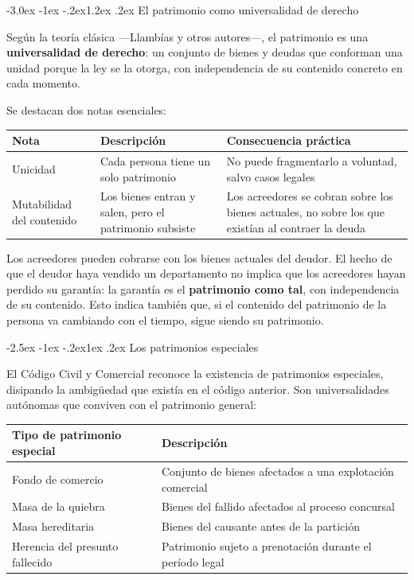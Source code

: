 \documentclass[12pt,oneside]{book}
\makeatletter
\renewcommand\section{\@startsection{section}{1}{\z@}%
  {-3.0ex \@plus -1ex \@minus -.2ex}{1.2ex \@plus .2ex}%
  {\normalfont\large\bfseries\color{acento}}}
\renewcommand\subsection{\@startsection{subsection}{2}{\z@}%
  {-2.5ex \@plus -1ex \@minus -.2ex}{1ex \@plus .2ex}%
  {\normalfont\normalsize\bfseries}}
\newenvironment{tabla}{%
    \par\medskip\begingroup\small\renewcommand{\arraystretch}{1.3}\noindent\ignorespaces
}{%
    \par\endgroup\medskip
}
\makeatother
\begin{document}
\section{El patrimonio como universalidad de derecho}

\begin{definicion}
Según la teoría clásica ---Llambías y otros autores---, el patrimonio es una \textbf{universalidad de derecho}: un conjunto de bienes y deudas que conforman una unidad porque la ley se la otorga, con independencia de su contenido concreto en cada momento.
\end{definicion}

Se destacan dos notas esenciales:

\begin{tabla}
\begin{tabularx}{\textwidth}{B{3.0cm}YY}
\toprule
Nota & \textbf{Descripción} & \textbf{Consecuencia práctica} \\
\midrule
Unicidad & Cada persona tiene un solo patrimonio & No puede fragmentarlo a voluntad, salvo casos legales \\
Mutabilidad del contenido & Los bienes entran y salen, pero el patrimonio subsiste & Los acreedores se cobran sobre los bienes actuales, no sobre los que existían al contraer la deuda \\
\bottomrule
\end{tabularx}
\end{tabla}

Los acreedores pueden cobrarse con los bienes actuales del deudor. El hecho de que el deudor haya vendido un departamento no implica que los acreedores hayan perdido su garantía: la garantía es el \textbf{patrimonio como tal}, con independencia de su contenido. Esto indica también que, si el contenido del patrimonio de la persona va cambiando con el tiempo, sigue siendo su patrimonio.

\subsection{Los patrimonios especiales}

El Código Civil y Comercial reconoce la existencia de patrimonios especiales, disipando la ambigüedad que existía en el código anterior. Son universalidades autónomas que conviven con el patrimonio general:

\begin{tabla}
\begin{tabularx}{\textwidth}{B{4.6cm}Y}
\toprule
Tipo de patrimonio especial & \textbf{Descripción} \\
\midrule
Fondo de comercio & Conjunto de bienes afectados a una explotación comercial \\
Masa de la quiebra & Bienes del fallido afectados al proceso concursal \\
Masa hereditaria & Bienes del causante antes de la partición \\
Herencia del presunto fallecido & Patrimonio sujeto a prenotación durante el período legal \\
\bottomrule
\end{tabularx}
\end{tabla}
\end{document}
